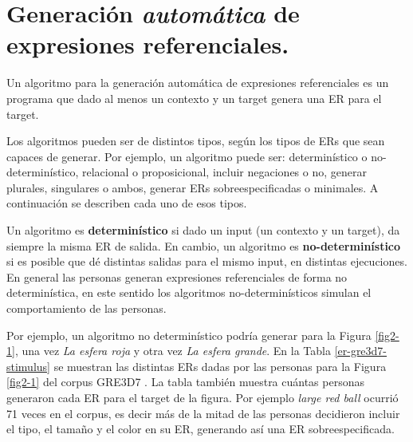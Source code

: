 \section{Generaci\'on \emph{autom\'atica} de expresiones referenciales.}
\label{sec:tipos_algoritmos}

Un algoritmo para la generaci\'on autom\'atica de expresiones referenciales es un programa que dado al menos un contexto y un target genera una ER para el target.

Los algoritmos pueden ser de distintos tipos, seg\'un los tipos de ERs que sean capaces de generar. Por ejemplo, un algoritmo puede ser: determin\'{i}stico o no-determin\'{i}stico, relacional o proposicional, incluir negaciones o no, generar plurales, singulares o ambos, generar ERs sobreespecificadas o minimales. A continuaci\'on se describen cada uno de esos tipos.

Un algoritmo es {\bf determin\'{i}stico} si dado un input (un contexto y un target), da siempre la misma ER de salida. En cambio, un algoritmo es {\bf no-determin\'{i}stico} si es posible que d\'e distintas salidas para el mismo input, en distintas ejecuciones. En general las personas generan expresiones referenciales de forma no determin\'istica, en este sentido los algoritmos no-determin\'isticos simulan el comportamiento de las personas. 

Por ejemplo, un algoritmo no determin\'istico podr\'ia generar para la Figura \ref{fig2-1}, una vez {\it La esfera roja} y otra vez {\it La esfera grande}. En la Tabla \ref{er-gre3d7-stimulus} se muestran las distintas ERs dadas por las personas para la Figura \ref{fig2-1} del corpus GRE3D7 \cite{gre3d7}. La tabla tambi\'en muestra cu\'antas personas generaron cada ER para el target de la figura. Por ejemplo {\it large red ball} ocurri\'o 71 veces en el corpus, es decir m\'as de la mitad de las personas decidieron incluir el tipo, el tama\~no y el color en su ER, generando as\'i una ER sobreespecificada.

